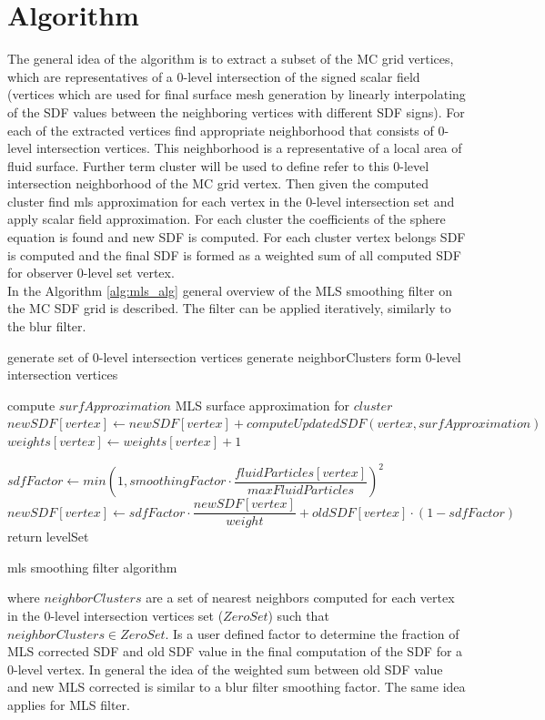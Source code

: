 \section{Algorithm}
The general idea of the algorithm is to extract a subset of the MC grid vertices, which are representatives of a 0-level intersection of the signed scalar field (vertices which are used for  final surface mesh generation by linearly interpolating of the SDF values between the neighboring vertices with different SDF signs). For each of the extracted vertices find appropriate neighborhood that consists of 0-level intersection vertices. This neighborhood is a representative of a local area of fluid surface. Further term cluster will be used to define refer to this 0-level intersection neighborhood of the MC grid vertex. Then given the computed cluster find mls approximation for each vertex in the 0-level intersection set and apply scalar field approximation. For each cluster the coefficients of the sphere equation is found and new SDF is computed. For each cluster vertex belongs SDF is computed and the final SDF is formed as a weighted sum of all computed SDF for observer 0-level set vertex.\\
In the Algorithm \ref{alg:mls_alg} general overview of the MLS smoothing filter on the MC SDF grid is described. The filter can be applied iteratively, similarly to the blur filter.
\begin{algorithm}
	\scriptsize
	\begin{algorithmic}
		\State generate set of 0-level intersection vertices 
		\State generate neighborClusters form 0-level intersection vertices 
			
			\State compute $surfApproximation$ MLS surface approximation for $cluster$
				\State $newSDF[vertex] \gets newSDF[vertex] + computeUpdatedSDF(vertex, surfApproximation)$
				\State $weights[vertex] \gets weights[vertex] + 1$
			\EndFor
		\EndFor

			\State $sdfFactor \gets min\left(1, smoothingFactor \cdot \dfrac{fluidParticles[vertex]}{maxFluidParticles}\right)^2$
			\State $newSDF[vertex] \gets sdfFactor \cdot \dfrac{newSDF[vertex]}{weight} + oldSDF[vertex] \cdot (1 - sdfFactor)$
		\EndFor
		\State return levelSet
	\end{algorithmic}
	\caption{mls smoothing filter algorithm}
	\label{alg:mls_alg}
\end{algorithm}
where $neighborClusters$ are a set of nearest neighbors computed for each vertex in the 0-level intersection vertices set ($ZeroSet$) such that $neighborClusters \in ZeroSet$. Is a user defined factor to determine the fraction of MLS corrected SDF and old SDF value in the final computation of the SDF for a 0-level vertex. In general the idea of the weighted sum between old SDF value and new MLS corrected is similar to a blur filter smoothing factor. The same idea applies for MLS filter.\\

